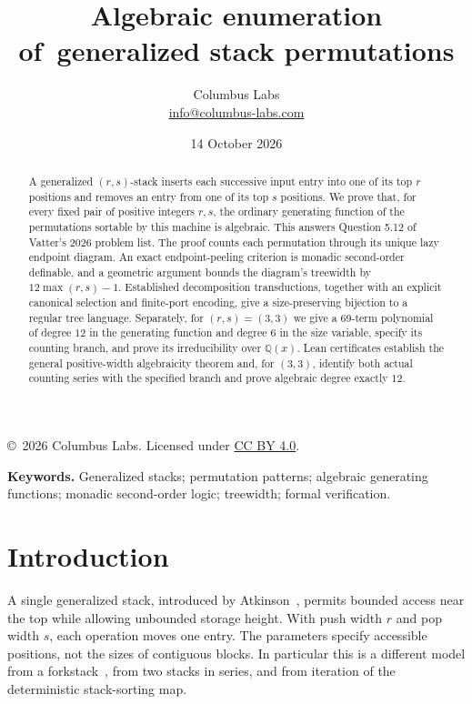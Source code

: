 \documentclass[11pt]{article}
\title{Algebraic enumeration of\ generalized stack permutations}
\author{Columbus Labs\\\small\href{mailto:info@columbus-labs.com}{info@columbus-labs.com}}
\date{14 October 2026}
\theoremstyle{definition}\newtheorem{definition}[theorem]{Definition}
\theoremstyle{remark}\newtheorem{remark}[theorem]{Remark}
\newcommand{\Q}{\mathbb Q}
\begin{document}
\maketitle
\begin{center}\footnotesize\copyright\ 2026 Columbus Labs. Licensed under \href{https://creativecommons.org/licenses/by/4.0/}{CC BY 4.0}.\end{center}
\vspace{-1.4em}
\begin{abstract}
A generalized $(r,s)$-stack inserts each successive input entry into one of its top $r$ positions and removes an entry from one of its top $s$ positions. We prove that, for every fixed pair of positive integers $r,s$, the ordinary generating function of the permutations sortable by this machine is algebraic. This answers Question 5.12 of Vatter's 2026 problem list. The proof counts each permutation through its unique lazy endpoint diagram. An exact endpoint-peeling criterion is monadic second-order definable, and a geometric argument bounds the diagram's treewidth by $12\max(r,s)-1$. Established decomposition transductions, together with an explicit canonical selection and finite-port encoding, give a size-preserving bijection to a regular tree language. Separately, for $(r,s)=(3,3)$ we give a 69-term polynomial of degree $12$ in the generating function and degree $6$ in the size variable, specify its counting branch, and prove its irreducibility over $\Q(x)$. Lean certificates establish the general positive-width algebraicity theorem and, for $(3,3)$, identify both actual counting series with the specified branch and prove algebraic degree exactly $12$.
\end{abstract}
\noindent\textbf{Keywords.} Generalized stacks; permutation patterns; algebraic generating functions; monadic second-order logic; treewidth; formal verification.


\section{Introduction}
A single generalized stack, introduced by Atkinson~\cite{Atkinson1998}, permits bounded access near the top while allowing unbounded storage height. With push width $r$ and pop width $s$, each operation moves one entry. The parameters specify accessible positions, not the sizes of contiguous blocks. In particular this is a different model from a forkstack~\cite{AlbertAtkinson2003}, from two stacks in series, and from iteration of the deterministic stack-sorting map.
\end{document}
